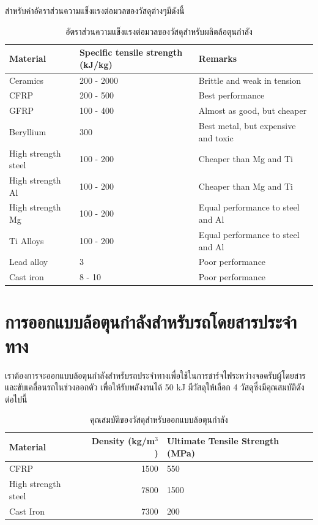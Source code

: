 \documentclass[a4paper,nobib,openany,10pt]{tufte-book}
\begin{document}
สำหรับค่าอัคราส่วนความแข็งแรงต่อมวลของวัสดุต่างๆมีดังนี้

\begin{table}[htbp]
\caption{อัตราส่วนความแข็งแรงต่อมวลของวัสดุสำหรับผลิตล้อตุนกำลัง}
\centering
\begin{tabular}{p{2.5cm}p{3cm}p{3.5cm}}
\toprule
Material & Specific tensile strength (kJ/kg) & Remarks\\
\midrule
Ceramics & 200 - 2000 & Brittle and weak in tension\\
CFRP & 200 - 500 & Best performance\\
GFRP & 100 - 400 & Almost as good, but cheaper\\
Beryllium & 300 & Best metal, but expensive and toxic\\
High strength steel & 100 - 200 & Cheaper than Mg and Ti\\
High strength Al & 100 - 200 & Cheaper than Mg and Ti\\
High strength Mg & 100 - 200 & Equal performance to steel and Al\\
Ti Alloys & 100 - 200 & Equal performance to steel and Al\\
Lead alloy & 3 & Poor performance\\
Cast iron & 8 - 10 & Poor performance\\
\bottomrule
\end{tabular}
\end{table}

\section{การออกแบบล้อตุนกำลังสำหรับรถโดยสารประจำทาง}
\label{sec:org0f06d37}

เราต้องการจะออกแบบล้อตุนกำลังสำหรับรถประจำทางเพื่อใช้ในการชาร์จไฟระหว่างจอดรับผู้โดยสาร
และขับเคลื่อนรถในช่วงออกตัว เพื่อให้รับพลังงานได้ 50 kJ มีวัสดุให้เลือก
4 วัสดุซึ่งมีคุณสมบัติดังต่อไปนี้

\begin{table}[htbp]
\caption{คุณสมบัติของวัสดุสำหรับออกแบบล้อตุนกำลัง}
\centering
\begin{tabular}{lrp{3cm}}
\toprule
Material & Density (kg/m\(^{\text{3}}\)) & Ultimate Tensile Strength (MPa)\\
\midrule
CFRP & 1500 & 550\\
High strength steel & 7800 & 1500\\
Cast Iron & 7300 & 200\\
\bottomrule
\end{tabular}
\end{table}
\end{document}
